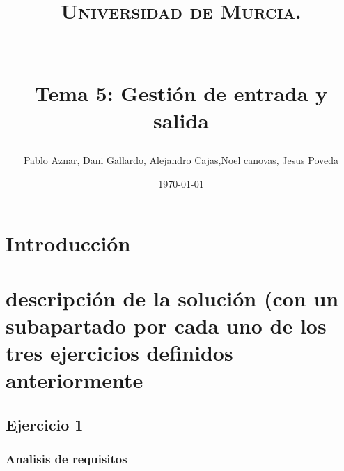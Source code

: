 \documentclass[paper=a4, fontsize=11pt, spanish]{scrartcl}
\title{
  \normalfont \normalsize 

  \textsc{Universidad de Murcia.} \\ [25pt] %
    
  \textbf{ \LARGE } \\ [25pt]
  
  \horrule{0.5pt} \\[0.4cm] %
  
  \huge Tema 5: Gestión de entrada y salida  
  \horrule{2pt} \\[0.5cm] %
}
\author{Pablo Aznar, Dani Gallardo, Alejandro Cajas,Noel canovas, Jesus Poveda} %
\date{\normalsize\today} %
\numberwithin{equation}{section} %
\numberwithin{figure}{section} %
\numberwithin{table}{section} %
\begin{document}
\maketitle %

\newpage %
\tableofcontents
\newpage %

\section{Introducción}

\section{descripción de la solución (con un
subapartado por cada uno de los tres ejercicios definidos anteriormente}

\subsection{Ejercicio 1}

\subsubsection{Analisis de requisitos}
\end{document}
